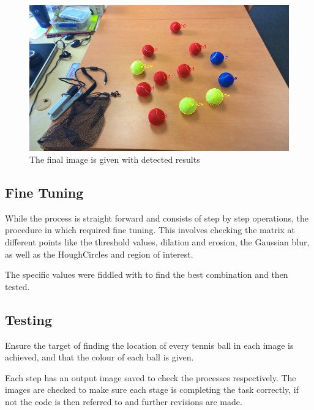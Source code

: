 \documentclass[a4paper, 10pt]{article}
\begin{document}
\begin{figure}[H]
  \includegraphics[width=\linewidth]{images/Final}
  \caption{The final image is given with detected results}
  \label{fig:The final image is given with detected results}
\end{figure}



\subsection{Fine Tuning} 

While the process is straight forward and consists of step by step operations, the procedure in which required fine tuning. This involves checking the matrix at different points like the threshold values, dilation and erosion, the Gaussian blur, as well as the HoughCircles and region of interest.

The specific values were fiddled with to find the best combination and then tested.

\clearpage
\subsection{Testing}

Ensure the target of finding the location of every tennis ball in each image is achieved, and that the colour of each ball is given.

Each step has an output image saved to check the processes respectively. The images are checked to make sure each stage is completing the task correctly, if not the code is then referred to and further revisions are made.
\end{document}

